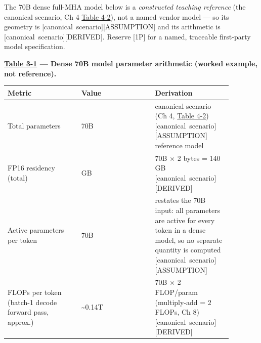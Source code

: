 The 70B dense full-MHA model below is a \emph{constructed teaching
reference} (the canonical scenario, Ch 4 \hyperref[tab:4.2]{Table 4-2}), not a named vendor
model --- so its geometry is \mbox{{[}canonical scenario{]}}\hspace{0pt}\mbox{{[}ASSUMPTION{]}}
and its arithmetic is \mbox{{[}canonical scenario{]}}\hspace{0pt}\mbox{{[}DERIVED{]}}. Reserve
\mbox{{[}1P{]}} for a named, traceable first-party model specification.

\textbf{\hyperref[tab:3.1]{Table 3-1} --- Dense 70B model parameter arithmetic (worked
example, not reference).}

\nopagebreak[4]
\begin{longtable}[]{@{}
  >{\raggedright\arraybackslash}p{0.2927\linewidth}
  >{\raggedright\arraybackslash}p{0.2927\linewidth}
  >{\raggedright\arraybackslash}p{0.2927\linewidth}@{}}
\toprule\noalign{}
\begin{minipage}[b]{\linewidth}\raggedright
Metric
\end{minipage} & \begin{minipage}[b]{\linewidth}\raggedright
Value
\end{minipage} & \begin{minipage}[b]{\linewidth}\raggedright
Derivation
\end{minipage} \\
\midrule\noalign{}
\endhead
\bottomrule\noalign{}
\endlastfoot
Total parameters & 70B & canonical scenario (Ch 4, \hyperref[tab:4.2]{Table 4-2})
\mbox{{[}canonical scenario{]}}\hspace{0pt}\mbox{{[}ASSUMPTION{]}} reference model \\
\noalign{\label{tab:3.1}}
FP16 residency (total) & 140 GB & 70B × 2 bytes = 140 GB \mbox{{[}canonical
scenario{]}}\hspace{0pt}\mbox{{[}DERIVED{]}} \\
Active parameters per token & 70B & restates the 70B input: all
parameters are active for every token in a dense model, so no separate
quantity is computed \mbox{{[}canonical scenario{]}}\hspace{0pt}\mbox{{[}ASSUMPTION{]}} \\
FLOPs per token (batch-1 decode forward pass, approx.) &
\textasciitilde0.14T & 70B × 2 FLOP/param (multiply-add = 2 FLOPs, Ch 8)
\mbox{{[}canonical scenario{]}}\hspace{0pt}\mbox{{[}DERIVED{]}} \\
\end{longtable}

